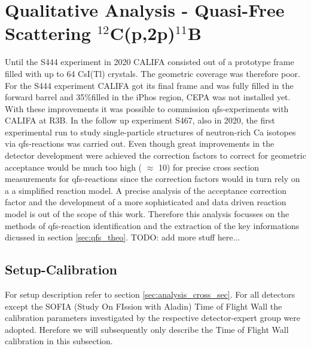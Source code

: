 \section{Qualitative Analysis - Quasi-Free Scattering $^{12}$C(p,2p)$^{11}$B}
Until the S444 experiment in 2020 CALIFA consisted out of a prototype frame filled with up to 64 CsI(Tl) crystals. The geometric coverage was therefore poor. For the S444 experiment CALIFA got its final frame and was fully filled in the forward barrel and 35\%filled in the iPhos region, CEPA was not installed yet. With these improvements it was possible to commission qfs-experiments with CALIFA at R3B. In the follow up experiment S467, also in 2020, the first experimental run to study single-particle structures of neutron-rich Ca isotopes via qfs-reactions was carried out.\newline
Even though great improvements in the detector development  were achieved the correction factors to correct for geometric acceptance would be much too high ( $\approx$ 10) for precise cross section measurements for qfs-reactions since the correction factors would in turn rely on a a simplified reaction model. A precise analysis of the acceptance correction factor and the development of a more sophisticated and data driven reaction model is out of the scope of this work. Therefore this analysis focusses on the methods of qfs-reaction identification and the extraction of the key informations dicussed in section \ref{sec:qfs_theo}. TODO: add more stuff here...\newline
\subsection{Setup-Calibration}
For setup description refer to section \ref{sec:analysis_cross_sec}. For all detectors except the SOFIA (Study On FIssion with Aladin) Time of Flight Wall the calibration parameters investigated by the respective detector-expert group were adopted. Herefore we will subsequently only describe the Time of Flight Wall calibration in this subsection.
